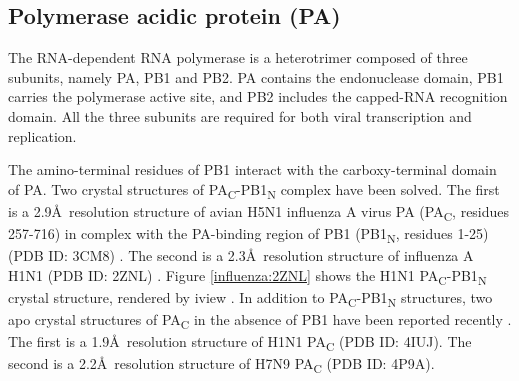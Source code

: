 
\subsection{Polymerase acidic protein (PA)}

The RNA-dependent RNA polymerase is a heterotrimer composed of three subunits, namely PA, PB1 and PB2. PA contains the endonuclease domain, PB1 carries the polymerase active site, and PB2 includes the capped-RNA recognition domain. All the three subunits are required for both viral transcription and replication.%

The amino-terminal residues of PB1 interact with the carboxy-terminal domain of PA. Two crystal structures of PA\textsubscript{C}-PB1\textsubscript{N} complex have been solved. The first is a 2.9\AA\ resolution structure of avian H5N1 influenza A virus PA (PA\textsubscript{C}, residues 257-716) in complex with the PA-binding region of PB1 (PB1\textsubscript{N}, residues 1-25) (PDB ID: 3CM8) \citep{1540}. The second is a 2.3\AA\ resolution structure of influenza A H1N1 (PDB ID: 2ZNL) \citep{1141}. Figure \ref{influenza:2ZNL} shows the H1N1 PA\textsubscript{C}-PB1\textsubscript{N} crystal structure, rendered by iview \citep{1366}. In addition to PA\textsubscript{C}-PB1\textsubscript{N} structures, two apo crystal structures of PA\textsubscript{C} in the absence of PB1 have been reported recently \citep{1585}. The first is a 1.9\AA\ resolution structure of H1N1 PA\textsubscript{C} (PDB ID: 4IUJ). The second is a 2.2\AA\ resolution structure of H7N9 PA\textsubscript{C} (PDB ID: 4P9A).

